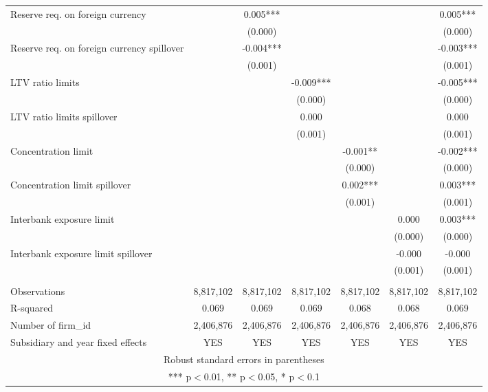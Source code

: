 \begin{tabular}{lcccccc}
Reserve req. on foreign currency &  & 0.005*** &  &  &  & 0.005*** \\
 &  & (0.000) &  &  &  & (0.000) \\
Reserve req. on foreign currency spillover &  & -0.004*** &  &  &  & -0.003*** \\
 &  & (0.001) &  &  &  & (0.001) \\
LTV ratio limits &  &  & -0.009*** &  &  & -0.005*** \\
 &  &  & (0.000) &  &  & (0.000) \\
LTV ratio limits spillover &  &  & 0.000 &  &  & 0.000 \\
 &  &  & (0.001) &  &  & (0.001) \\
Concentration limit &  &  &  & -0.001** &  & -0.002*** \\
 &  &  &  & (0.000) &  & (0.000) \\
Concentration limit spillover &  &  &  & 0.002*** &  & 0.003*** \\
 &  &  &  & (0.001) &  & (0.001) \\
Interbank exposure limit &  &  &  &  & 0.000 & 0.003*** \\
 &  &  &  &  & (0.000) & (0.000) \\
Interbank exposure limit spillover &  &  &  &  & -0.000 & -0.000 \\
 &  &  &  &  & (0.001) & (0.001) \\
 &  &  &  &  &  &  \\
Observations & 8,817,102 & 8,817,102 & 8,817,102 & 8,817,102 & 8,817,102 & 8,817,102 \\
R-squared & 0.069 & 0.069 & 0.069 & 0.068 & 0.068 & 0.069 \\
Number of firm\_id & 2,406,876 & 2,406,876 & 2,406,876 & 2,406,876 & 2,406,876 & 2,406,876 \\
 Subsidiary and year fixed effects & YES & YES & YES & YES & YES & YES \\ \hline
\multicolumn{7}{c}{ Robust standard errors in parentheses} \\
\multicolumn{7}{c}{ *** p$<$0.01, ** p$<$0.05, * p$<$0.1} \\
\end{tabular}
